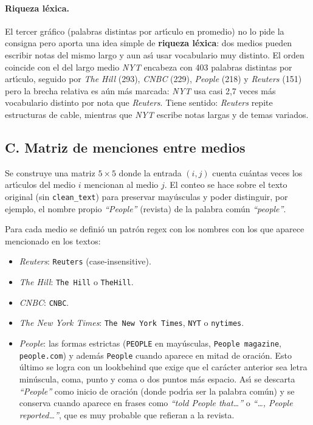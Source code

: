 \documentclass[11pt,a4paper]{article}
\begin{document}
\paragraph{Riqueza l\'{e}xica.} El tercer gr\'{a}fico (palabras distintas por art\'{\i}culo en promedio) no lo pide la consigna pero aporta una idea simple de \textbf{riqueza l\'{e}xica}: dos medios pueden escribir notas del mismo largo y aun as\'{\i} usar vocabulario muy distinto. El orden coincide con el del largo medio \textit{NYT} encabeza con 403 palabras distintas por art\'{\i}culo, seguido por \textit{The Hill} (293), \textit{CNBC} (229), \textit{People} (218) y \textit{Reuters} (151) pero la brecha relativa es a\'{u}n m\'{a}s marcada: \textit{NYT} usa casi 2,7 veces m\'{a}s vocabulario distinto por nota que \textit{Reuters}. Tiene sentido: \textit{Reuters} repite estructuras de cable, mientras que \textit{NYT} escribe notas largas y de temas variados.

\subsection{C. Matriz de menciones entre medios}

Se construye una matriz $5 \times 5$ donde la entrada $(i, j)$ cuenta cu\'{a}ntas veces los art\'{\i}culos del medio $i$ mencionan al medio $j$. El conteo se hace sobre el texto original (sin \texttt{clean\_text}) para preservar may\'{u}sculas y poder distinguir, por ejemplo, el nombre propio \textit{``People''} (revista) de la palabra com\'{u}n \textit{``people''}.

Para cada medio se defini\'{o} un patr\'{o}n regex con los nombres con los que aparece mencionado en los textos:
\begin{itemize}
    \item \textit{Reuters}: \texttt{Reuters} (case-insensitive).
    \item \textit{The Hill}: \texttt{The Hill} o \texttt{TheHill}.
    \item \textit{CNBC}: \texttt{CNBC}.
    \item \textit{The New York Times}: \texttt{The New York Times}, \texttt{NYT} o \texttt{nytimes}.
    \item \textit{People}: las formas estrictas (\texttt{PEOPLE} en may\'{u}sculas, \texttt{People magazine}, \texttt{people.com}) y adem\'{a}s \texttt{People} cuando aparece en mitad de oraci\'{o}n. Esto \'{u}ltimo se logra con un lookbehind que exige que el car\'{a}cter anterior sea letra min\'{u}scula, coma, punto y coma o dos puntos m\'{a}s espacio. As\'{\i} se descarta \textit{``People''} como inicio de oraci\'{o}n (donde podr\'{\i}a ser la palabra com\'{u}n) y se conserva cuando aparece en frases como \textit{``told People that\dots''} o \textit{``\dots, People reported\dots''}, que es muy probable que refieran a la revista.
\end{itemize}
\end{document}

